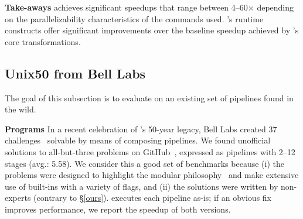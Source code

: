 \documentclass[letterpaper,twocolumn,10pt]{article}
\newcommand{\heading}[1]{\vspace{4pt}\noindent\textbf{#1}\enspace}
\newcommand{\kk}[1]{[{\color{magenta}kk: #1}]}
\begin{document}

\heading{Take-aways}
\sys achieves significant speedups that range between 4--60$\times$ depending on the parallelizability characteristics of the commands used.
\sys's runtime constructs offer significant improvements over the baseline speedup achieved by \sys's core transformations.

\subsection{Unix50 from Bell Labs}
\label{unix50}

The goal of this subsection is to evaluate \sys on an existing set of \unix pipelines found in the wild.

\heading{Programs}
In a recent celebration of \unix's 50-year legacy, Bell Labs created 37 challenges~\cite{unix50} solvable by means of composing \unix pipelines.
We found unofficial solutions to all-but-three problems on GitHub~\cite{unix50sol}, expressed as pipelines with 2--12 stages (avg.: 5.58).
We consider this a good set of benchmarks because
  (i) the problems were designed to highlight the \unix modular philosophy~\cite{mcilroy1978unix} and make extensive use of built-ins with a variety of flags, and
  (ii) the solutions were written by non-experts (contrary to \S\ref{ours}).
\sys executes each pipeline as-is; 
  if an obvious fix improves performance, we report the speedup of both versions. %

\end{document}
